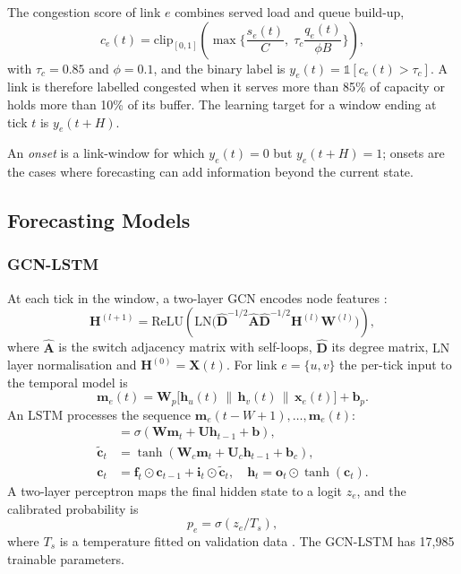 \documentclass[conference]{IEEEtran}
\begin{document}
The congestion score of link $e$ combines served load and queue build-up,
\begin{equation}
c_e(t)=\mathrm{clip}_{[0,1]}\!\left(\max\!\Big\{\frac{s_e(t)}{C},\; \tau_c\frac{q_e(t)}{\phi B}\Big\}\right),
\label{eq:score}
\end{equation}
with $\tau_c=0.85$ and $\phi=0.1$, and the binary label is $y_e(t)=\mathbb{1}[c_e(t)>\tau_c]$. A link is therefore labelled congested when it serves more than 85\% of capacity or holds more than 10\% of its buffer. The learning target for a window ending at tick $t$ is $y_e(t+H)$.

An \emph{onset} is a link-window for which $y_e(t)=0$ but $y_e(t+H)=1$; onsets are the cases where forecasting can add information beyond the current state.

\subsection{Forecasting Models}
\subsubsection{GCN-LSTM}
At each tick in the window, a two-layer GCN encodes node features \cite{kipf2017gcn}:
\begin{equation}
\mathbf{H}^{(l+1)}=\mathrm{ReLU}\!\left(\mathrm{LN}\big(\hat{\mathbf{D}}^{-1/2}\hat{\mathbf{A}}\hat{\mathbf{D}}^{-1/2}\mathbf{H}^{(l)}\mathbf{W}^{(l)}\big)\right),
\label{eq:gcn}
\end{equation}
where $\hat{\mathbf{A}}$ is the switch adjacency matrix with self-loops, $\hat{\mathbf{D}}$ its degree matrix, $\mathrm{LN}$ layer normalisation and $\mathbf{H}^{(0)}=\mathbf{X}(t)$. For link $e=\{u,v\}$ the per-tick input to the temporal model is
\begin{equation}
\mathbf{m}_e(t)=\mathbf{W}_p\big[\mathbf{h}_u(t)\,\|\,\mathbf{h}_v(t)\,\|\,\mathbf{x}_e(t)\big]+\mathbf{b}_p .
\label{eq:edgeemb}
\end{equation}
An LSTM \cite{hochreiter1997lstm} processes the sequence $\mathbf{m}_e(t-W+1),\dots,\mathbf{m}_e(t)$:
\begin{align}
[\mathbf{i}_t;\mathbf{f}_t;\mathbf{o}_t] &= \sigma(\mathbf{W}\mathbf{m}_t+\mathbf{U}\mathbf{h}_{t-1}+\mathbf{b}),\label{eq:lstm1}\\
\tilde{\mathbf{c}}_t &= \tanh(\mathbf{W}_c\mathbf{m}_t+\mathbf{U}_c\mathbf{h}_{t-1}+\mathbf{b}_c),\label{eq:lstm2}\\
\mathbf{c}_t &= \mathbf{f}_t\odot\mathbf{c}_{t-1}+\mathbf{i}_t\odot\tilde{\mathbf{c}}_t,\quad \mathbf{h}_t = \mathbf{o}_t\odot\tanh(\mathbf{c}_t).\label{eq:lstm3}
\end{align}
A two-layer perceptron maps the final hidden state to a logit $z_e$, and the calibrated probability is
\begin{equation}
p_e=\sigma\!\left(z_e/T_s\right),
\label{eq:temp}
\end{equation}
where $T_s$ is a temperature fitted on validation data \cite{guo2017calibration}. The GCN-LSTM has 17,985 trainable parameters.
\end{document}
